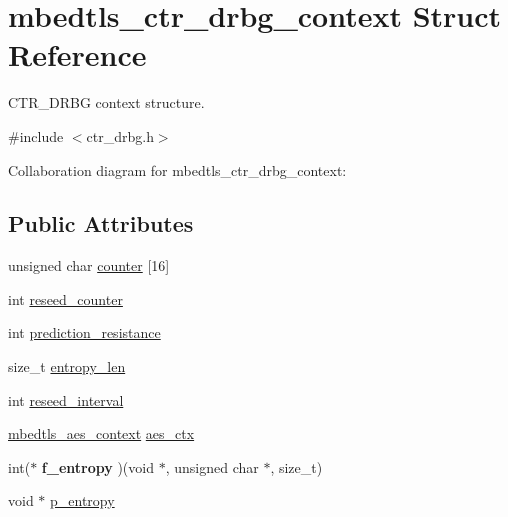 \hypertarget{structmbedtls__ctr__drbg__context}{}\section{mbedtls\+\_\+ctr\+\_\+drbg\+\_\+context Struct Reference}
\label{structmbedtls__ctr__drbg__context}


C\+T\+R\+\_\+\+D\+R\+BG context structure.  




{\ttfamily \#include $<$ctr\+\_\+drbg.\+h$>$}



Collaboration diagram for mbedtls\+\_\+ctr\+\_\+drbg\+\_\+context\+:
\subsection*{Public Attributes}
\begin{DoxyCompactItemize}
\item 
unsigned char \mbox{\hyperlink{structmbedtls__ctr__drbg__context_a45ccb95b2b7828711c158fc4a06d41fc}{counter}} \mbox{[}16\mbox{]}
\item 
int \mbox{\hyperlink{structmbedtls__ctr__drbg__context_abdbeba1194553f4f1a3534712dc0c9f9}{reseed\+\_\+counter}}
\item 
int \mbox{\hyperlink{structmbedtls__ctr__drbg__context_ae521e373913548f732e0cdfe3e82d2ac}{prediction\+\_\+resistance}}
\item 
size\+\_\+t \mbox{\hyperlink{structmbedtls__ctr__drbg__context_aa874779eab1f355824ff692b33755476}{entropy\+\_\+len}}
\item 
int \mbox{\hyperlink{structmbedtls__ctr__drbg__context_a7b048c97f8dc916d89a0c7cd9d7f8522}{reseed\+\_\+interval}}
\item 
\mbox{\hyperlink{structmbedtls__aes__context}{mbedtls\+\_\+aes\+\_\+context}} \mbox{\hyperlink{structmbedtls__ctr__drbg__context_ab9513701b8389770eb294cbc4267ff92}{aes\+\_\+ctx}}
\item 
\mbox{\label{structmbedtls__ctr__drbg__context_a996a460946cf035a5de799c6fc905f62}} 
int($\ast$ {\bfseries f\+\_\+entropy} )(void $\ast$, unsigned char $\ast$, size\+\_\+t)
\item 
void $\ast$ \mbox{\hyperlink{structmbedtls__ctr__drbg__context_a85ca46b24fc75d3d1c091835c8c2e0b4}{p\+\_\+entropy}}
\end{DoxyCompactItemize}


